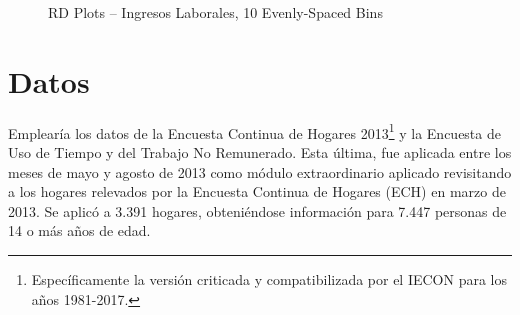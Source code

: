 \documentclass[15pt]{article}
\begin{document}
\begin{figure}
\caption{RD Plots – Ingresos Laborales, 10 Evenly-Spaced Bins}
\centering
{}
\end{figure}

\section*{Datos}

Emplearía los datos de la Encuesta Continua de Hogares 2013\footnote{Específicamente la versión criticada y compatibilizada por el IECON para los años 1981-2017.} y la Encuesta de Uso de Tiempo y del Trabajo No Remunerado. Esta última, fue aplicada entre los meses de mayo y agosto de 2013 como módulo extraordinario aplicado revisitando a los hogares relevados por la Encuesta Continua de Hogares (ECH) en marzo de 2013. Se aplicó a 3.391 hogares, obteniéndose información para 7.447 personas de 14 o más años de edad.\\
\end{document}

